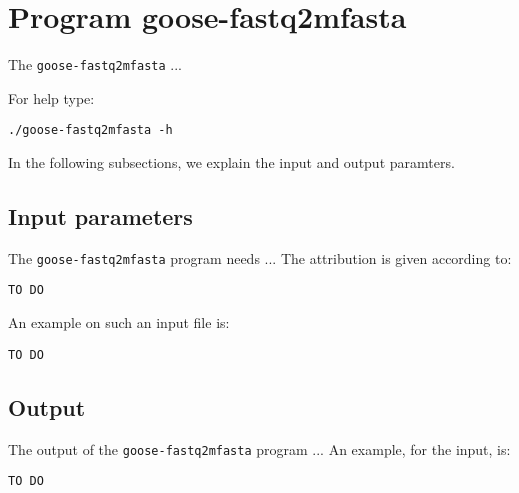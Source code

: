 \section{Program goose-fastq2mfasta}
The \texttt{goose-fastq2mfasta} ...

For help type:
\begin{lstlisting}
./goose-fastq2mfasta -h
\end{lstlisting}
In the following subsections, we explain the input and output paramters.

\subsection*{Input parameters}

The \texttt{goose-fastq2mfasta} program needs ...
The attribution is given according to:
\begin{lstlisting}
TO DO
\end{lstlisting}

An example on such an input file is:
\begin{lstlisting}
TO DO
\end{lstlisting}

\subsection*{Output}
The output of the \texttt{goose-fastq2mfasta} program ...
An example, for the input, is:
\begin{lstlisting}
TO DO
\end{lstlisting}
